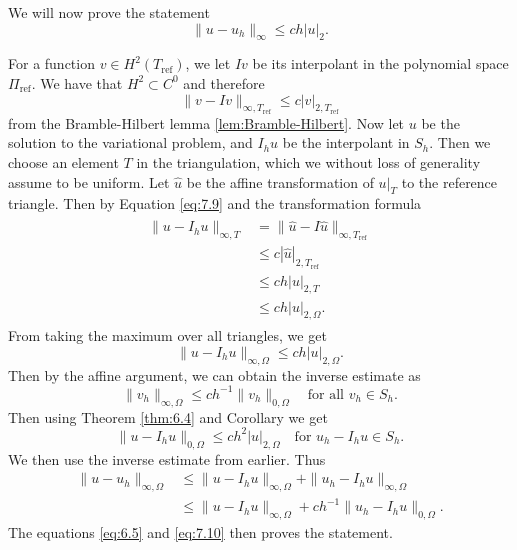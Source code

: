 We will now prove the statement
\begin{equation}
    \|u-u_h\|_{\infty}\leq ch|u|_2.
\end{equation}
\begin{bev}
    For a function $v\in H^2(T_{\text{ref}})$, we let $Iv$ be its interpolant in the polynomial space $\Pi_{\text{ref}}$.
    We have that $H^2\subset C^0$ and therefore 
    \begin{equation}
        \|v-Iv\|_{\infty,T_\text{ref}} \leq c|v|_{2,T_\text{ref}}
        \label{eq:7.9}
    \end{equation}
    from the Bramble-Hilbert lemma \ref{lem:Bramble-Hilbert}.
    Now let $u$ be the solution to the variational problem, and $I_hu$ be the interpolant in $S_h$.
    Then we choose an element $T$ in the triangulation, which we without loss of generality assume to be uniform. 
    Let $\hat{u}$ be the affine transformation of $u|_T$ to the reference triangle.
    Then by Equation \ref{eq:7.9} and the transformation formula %
    \begin{align}
        \begin{split}
            \|u-I_hu\|_{\infty,T} &= \|\hat{u} - I\hat{u}\|_{\infty,T_{\text{ref}}} \\
            &\leq c|\hat{u}|_{2,T_{\text{ref}}} \\
            &\leq ch|u|_{2,T} \\
            &\leq ch|u|_{2,\Omega}.
        \end{split}
        \label{eq:7.10}
    \end{align}
    From taking the maximum over all triangles, we get
    \begin{equation}
        \|u - I_hu \|_{\infty,\Omega} \leq ch|u|_{2,\Omega}.
    \end{equation}
    Then by the affine argument, we can obtain the inverse estimate as
    \begin{equation}
        \|v_h\|_{\infty,\Omega} \leq ch^{-1} \|v_h\|_{0,\Omega} \quad \text{for all } v_h\in S_h.
    \end{equation}
    Then using Theorem \ref{thm:6.4} and Corollary %
    we get
    \begin{equation}
        \|u-I_hu\|_{0,\Omega} \leq ch^2|u|_{2,\Omega}\quad \text{for } u_h-I_hu\in S_h.
    \end{equation}
    We then use the inverse estimate from earlier. Thus 
    \begin{align}
        \|u-u_h\|_{\infty,\Omega} &\leq \|u-I_hu\|_{\infty,\Omega} + \|u_h-I_hu\|_{\infty,\Omega} \\
        &\leq \|u-I_hu\|_{\infty,\Omega} + ch^{-1} \|u_h-I_hu\|_{0,\Omega}.
    \end{align}
    The equations \ref{eq:6.5} and \ref{eq:7.10} then proves the statement.
\end{bev}
